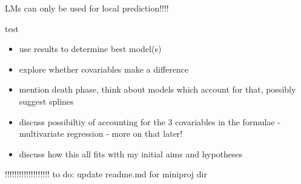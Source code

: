 \documentclass[11pt]{article}
\begin{document}
LMs can only be used for local prediction!!!!

test

\begin{itemize}
    \item use results to determine best model(s)
    \item explore whether covariables make a difference
    \item mention death phase, think about models which account for that, possibly suggest splines
    \item discuss possibiltiy of accounting for the 3 covariables in the formulae - multivariate regression - more on that later!
    \item discuss how this all fits with my initial aims and hypotheses
\end{itemize}



!!!!!!!!!!!!!!!!!!!
to do: update readme.md for miniproj dir
\newpage

\printbibliography[heading=bibintoc]
\end{document}
